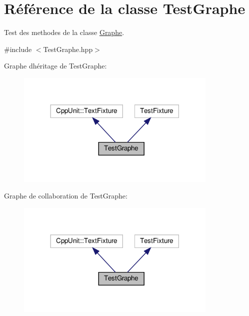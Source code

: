 \hypertarget{class_test_graphe}{}\section{Référence de la classe Test\+Graphe}
\label{class_test_graphe}


Test des methodes de la classe \hyperlink{class_graphe}{Graphe}.  




{\ttfamily \#include $<$Test\+Graphe.\+hpp$>$}



Graphe d\textquotesingle{}héritage de Test\+Graphe\+:\nopagebreak
\begin{figure}[H]
\begin{center}
\leavevmode
\includegraphics[width=272pt]{class_test_graphe__inherit__graph}
\end{center}
\end{figure}


Graphe de collaboration de Test\+Graphe\+:\nopagebreak
\begin{figure}[H]
\begin{center}
\leavevmode
\includegraphics[width=272pt]{class_test_graphe__coll__graph}
\end{center}
\end{figure}
